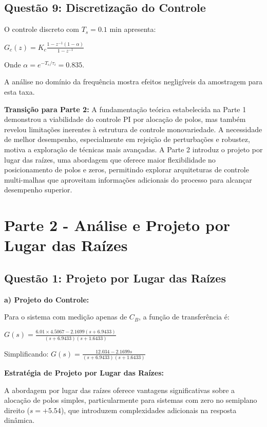 \documentclass[a4paper,12pt]{article}
\begin{document}
\subsection{Questão 9: Discretização do Controle}

O controle discreto com $T_s = 0.1$ min apresenta:

$G_c(z) = K_c \frac{1 - z^{-1}(1-\alpha)}{1 - z^{-1}}$

Onde $\alpha = e^{-T_s/\tau_i} = 0.835$.

A análise no domínio da frequência mostra efeitos negligíveis da amostragem para esta taxa.

\textbf{Transição para Parte 2:} A fundamentação teórica estabelecida na Parte 1 demonstrou a viabilidade do controle PI por alocação de polos, mas também revelou limitações inerentes à estrutura de controle monovariedade. A necessidade de melhor desempenho, especialmente em rejeição de perturbações e robustez, motiva a exploração de técnicas mais avançadas. A Parte 2 introduz o projeto por lugar das raízes, uma abordagem que oferece maior flexibilidade no posicionamento de polos e zeros, permitindo explorar arquiteturas de controle multi-malhas que aproveitam informações adicionais do processo para alcançar desempenho superior.

\newpage

\section{Parte 2 - Análise e Projeto por Lugar das Raízes}

\subsection{Questão 1: Projeto por Lugar das Raízes}

\textbf{a) Projeto do Controle:}

Para o sistema com medição apenas de $C_B$, a função de transferência é:

$G(s) = \frac{6.01 \times 4.5067 - 2.1699(s + 6.9433)}{(s + 6.9433)(s + 1.6433)}$

Simplificando: $G(s) = \frac{12.034 - 2.1699s}{(s + 6.9433)(s + 1.6433)}$

\textbf{Estratégia de Projeto por Lugar das Raízes:}

A abordagem por lugar das raízes oferece vantagens significativas sobre a alocação de polos simples, particularmente para sistemas com zero no semiplano direito ($s = +5.54$), que introduzem complexidades adicionais na resposta dinâmica.
\end{document}
